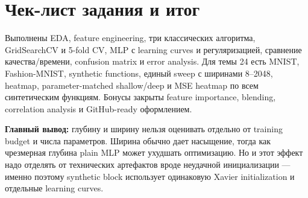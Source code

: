 \documentclass[11pt,a4paper]{extarticle}
\begin{document}
\section{Чек-лист задания и итог}

\hspace*{11mm}Выполнены EDA, feature engineering, три классических алгоритма, GridSearchCV и 5-fold CV, MLP с learning curves и регуляризацией, сравнение качества/времени, confusion matrix и error analysis. Для темы 24 есть MNIST, Fashion-MNIST, synthetic functions, единый sweep с ширинами 8--2048, heatmap, parameter-matched shallow/deep и MSE heatmap по всем синтетическим функциям. Бонусы закрыты feature importance, blending, correlation analysis и GitHub-ready оформлением.

\textbf{Главный вывод:} глубину и ширину нельзя оценивать отдельно от training budget и числа параметров. Ширина обычно дает насыщение, тогда как чрезмерная глубина plain MLP может ухудшать оптимизацию. Но и этот эффект надо отделять от технических артефактов вроде неудачной инициализации --- именно поэтому synthetic block использует одинаковую Xavier initialization и отдельные learning curves.

\end{document}
